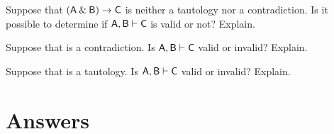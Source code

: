 \problempart
\begin{earg}
\item Suppose that $(\mathsf{A}\mathbin{\&}\mathsf{B})\rightarrow\mathsf{C}$ is neither a tautology nor a contradiction. Is it possible to determine if $\mathsf{A}, \mathsf{B} \vdash \mathsf{C}$ is valid or not? Explain.
\item Suppose that  is a contradiction. Is $\mathsf{A}, \mathsf{B} \vdash \mathsf{C}$ valid or invalid? Explain.
\item Suppose that  is a tautology. Is $\mathsf{A}, \mathsf{B}\vdash \mathsf{C}$ valid or invalid? Explain.
\end{earg}





\section{Answers}
\setcounter{ProbPart}{0}


